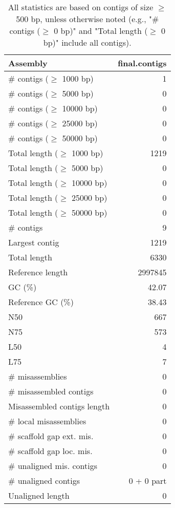 \documentclass[12pt,a4paper]{article}
\begin{document}
\begin{table}[ht]
\begin{center}
\caption{All statistics are based on contigs of size $\geq$ 500 bp, unless otherwise noted (e.g., "\# contigs ($\geq$ 0 bp)" and "Total length ($\geq$ 0 bp)" include all contigs).}
\begin{tabular}{|l*{1}{|r}|}
\hline
Assembly & final.contigs \\ \hline
\# contigs ($\geq$ 1000 bp) & 1 \\ \hline
\# contigs ($\geq$ 5000 bp) & 0 \\ \hline
\# contigs ($\geq$ 10000 bp) & 0 \\ \hline
\# contigs ($\geq$ 25000 bp) & 0 \\ \hline
\# contigs ($\geq$ 50000 bp) & 0 \\ \hline
Total length ($\geq$ 1000 bp) & 1219 \\ \hline
Total length ($\geq$ 5000 bp) & 0 \\ \hline
Total length ($\geq$ 10000 bp) & 0 \\ \hline
Total length ($\geq$ 25000 bp) & 0 \\ \hline
Total length ($\geq$ 50000 bp) & 0 \\ \hline
\# contigs & 9 \\ \hline
Largest contig & 1219 \\ \hline
Total length & 6330 \\ \hline
Reference length & 2997845 \\ \hline
GC (\%) & 42.07 \\ \hline
Reference GC (\%) & 38.43 \\ \hline
N50 & 667 \\ \hline
N75 & 573 \\ \hline
L50 & 4 \\ \hline
L75 & 7 \\ \hline
\# misassemblies & 0 \\ \hline
\# misassembled contigs & 0 \\ \hline
Misassembled contigs length & 0 \\ \hline
\# local misassemblies & 0 \\ \hline
\# scaffold gap ext. mis. & 0 \\ \hline
\# scaffold gap loc. mis. & 0 \\ \hline
\# unaligned mis. contigs & 0 \\ \hline
\# unaligned contigs & 0 + 0 part \\ \hline
Unaligned length & 0 \\ \hline

\end{tabular}
\end{center}
\end{table}
\end{document}
